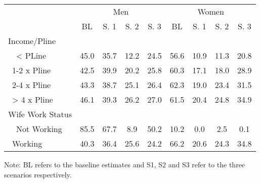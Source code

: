 \begin{tabular}{l*{8}{c}}
\hline\hline
          & \multicolumn{4}{c}{Men} & \multicolumn{4}{c}{Women} \\  \cline{2-5} \cline{6-9}
            &    BL&  S. 1&  S. 2&  S. 3&    BL&  S. 1&  S. 2&  S. 3\\
Income/Pline   & \multicolumn{8}{c}{} \\ 
\ \ < PLine &        45.0&        35.7&        12.2&        24.5&        56.6&        10.9&        11.3&        20.8\\
\ 1-2 x Pline&        42.5&        39.9&        20.2&        25.8&        60.3&        17.1&        18.0&        28.9\\
\ 2-4 x Pline&        43.3&        38.7&        25.1&        26.4&        62.3&        19.0&        23.4&        31.5\\
\ > 4 x Pline&        46.1&        39.3&        26.2&        27.0&        61.5&        20.4&        24.8&        34.9\\

\midrule

Wife Work Status   & \multicolumn{8}{c}{} \\ 
\ \ Not Working&        85.5&        67.7&         8.9&        50.2&        10.2&         0.0&         2.5&         0.1\\
\ Working   &        40.3&        36.4&        25.6&        24.2&        66.2&        20.6&        24.3&        34.8\\
\hline\hline
\end{tabular}
\footnotesize Note: BL refers to the baseline estimates and S1, S2 and S3 refer to the three scenarios respectively.
